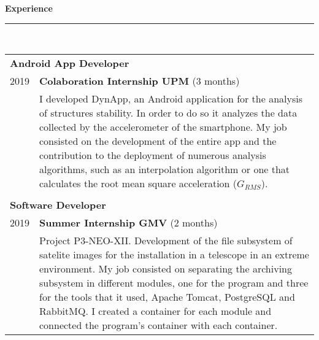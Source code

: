 \documentclass{article}
\begin{document}
\hspace{0.25cm}\vline\hspace{0.25cm}
\begin{minipage}[c]{0.66\linewidth}
  \setlength{\parskip}{0.3em}

  \textbf{\Large{\color{BlueViolet}Experience}}\\[-0.25cm]
  {\color{BlueViolet} \rule{\linewidth}{0.1mm} }\\[-0.05cm]
  \begin{tabular}{l l}
    \multicolumn{2}{p{6cm}}{\hspace{0.40cm} \textbf{Android App Developer}}\\[0.1cm]
    2019 & \textbf{Colaboration Internship UPM} (3 months)\\
         & \multicolumn{1}{p{11cm}}{I developed DynApp, an Android application for the analysis of structures stability. In order to do so it analyzes the data collected by the accelerometer of the smartphone. My job consisted on the development of the entire app and the contribution to the deployment of numerous analysis algorithms, such as an interpolation algorithm or one that calculates the root mean square acceleration ($G_{RMS}$).}\\ \\[-0.1cm]
    \multicolumn{2}{p{6cm}}{\hspace{0.40cm} \textbf{Software Developer}}\\[0.1cm]
    2019 & \textbf{Summer Internship GMV} (2 months)\\
         & \multicolumn{1}{p{11cm}}{Project P3-NEO-XII. Development of the file subsystem of satelite images for the installation in a telescope in an extreme environment. My job consisted on separating the archiving subsystem in different modules, one for the program and three for the tools that it used, Apache Tomcat, PostgreSQL and RabbitMQ. I created a container for each module and connected the program's container with each container.} \\
  \end{tabular}
  \vspace{0.3cm}
  

\end{minipage}
\end{document}
